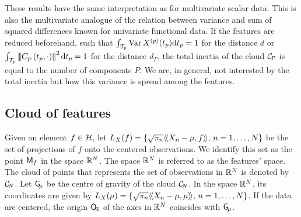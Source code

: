 \begin{remark}
    These results have the same interpretation as for multivariate scalar data. This is also the multivariate analogue of the relation between variance and sum of squared differences known for univariate functional data. If the features are reduced beforehand, such that $\int_{\mathcal{T}_{p}} \operatorname{Var}X^{(p)} (t_p) {\rm d} t_p = 1$ for the distance $d$ or $\int_{\mathcal{T}_{p}} \left|\!\left|\!\left|C_{p \cdot}(t_p, \cdot)\right|\!\right|\!\right|^2 {\rm d} t_p = 1$ for the distance $d_\Gamma$, the total inertia of the cloud $\mathcal{C}_{\!P}$ is equal to the number of components $P$. We are, in general, not interested by the total inertia but how this variance is spread among the features.
\end{remark}


\subsection{Cloud of features} %
\label{sub:cloud_of_features}

Given an element $f \in \mathcal{H}$, let $L_X(f) = \{\sqrt{\pi_n}\langle\!\langle X_n - \mu, f\rangle\!\rangle,\,n = 1, \dots, N\}$ be the set of projections of $f$ onto the centered observations. We identify this set as the point $\mathsf{M}_f$ in the space $\mathbb{R}^N$. The space $\mathbb{R}^N$ is referred to as the features' space. The cloud of points that represents the set of observations in $\mathbb{R}^N$ is denoted by $\mathcal{C}_{\!N}$. Let $\mathsf{G}_{\!\mu}$ be the centre of gravity of the cloud $\mathcal{C}_{\!N}$. In the space $\mathbb{R}^N$, its coordinates are given by $L_X(\mu) = \{\sqrt{\pi_n}\langle\!\langle X_n - \mu, \mu\rangle\!\rangle,\,n = 1, \dots, N\}$. If the data are centered, the origin $\mathsf{O}_{\!\mathbb{R}}$ of the axes in $\mathbb{R}^N$ coincides with $\mathsf{G}_{\!\mu}$.

